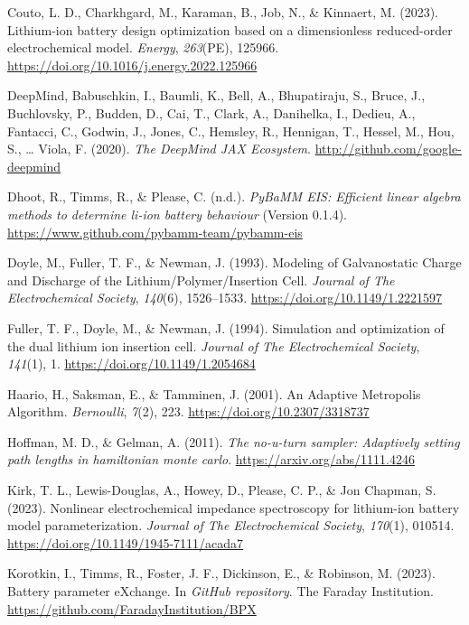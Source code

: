\documentclass[
]{article}
\newlength{\cslhangindent}
\newenvironment{CSLReferences}[2] %
 {\begin{list}{}{%
  \setlength{\itemindent}{0pt}
  \setlength{\leftmargin}{0pt}
  \setlength{\parsep}{0pt}
  \ifodd #1
   \setlength{\leftmargin}{\cslhangindent}
   \setlength{\itemindent}{-1\cslhangindent}
  \fi
  \setlength{\itemsep}{#2\baselineskip}}}
 {\end{list}}
\begin{document}
\begin{CSLReferences}{1}{0}
Couto, L. D., Charkhgard, M., Karaman, B., Job, N., \& Kinnaert, M.
(2023). Lithium-ion battery design optimization based on a dimensionless
reduced-order electrochemical model. \emph{Energy}, \emph{263}(PE),
125966. \url{https://doi.org/10.1016/j.energy.2022.125966}

DeepMind, Babuschkin, I., Baumli, K., Bell, A., Bhupatiraju, S., Bruce,
J., Buchlovsky, P., Budden, D., Cai, T., Clark, A., Danihelka, I.,
Dedieu, A., Fantacci, C., Godwin, J., Jones, C., Hemsley, R., Hennigan,
T., Hessel, M., Hou, S., \ldots{} Viola, F. (2020). \emph{The
{D}eep{M}ind {JAX} {E}cosystem}. \url{http://github.com/google-deepmind}

Dhoot, R., Timms, R., \& Please, C. (n.d.). \emph{PyBaMM EIS: Efficient
linear algebra methods to determine li-ion battery behaviour} (Version
0.1.4). \url{https://www.github.com/pybamm-team/pybamm-eis}

Doyle, M., Fuller, T. F., \& Newman, J. (1993). {Modeling of
Galvanostatic Charge and Discharge of the Lithium/Polymer/Insertion
Cell}. \emph{Journal of The Electrochemical Society}, \emph{140}(6),
1526--1533. \url{https://doi.org/10.1149/1.2221597}

Fuller, T. F., Doyle, M., \& Newman, J. (1994). Simulation and
optimization of the dual lithium ion insertion cell. \emph{Journal of
The Electrochemical Society}, \emph{141}(1), 1.
\url{https://doi.org/10.1149/1.2054684}

Haario, H., Saksman, E., \& Tamminen, J. (2001). An {Adaptive}
{Metropolis} {Algorithm}. \emph{Bernoulli}, \emph{7}(2), 223.
\url{https://doi.org/10.2307/3318737}

Hoffman, M. D., \& Gelman, A. (2011). \emph{The no-u-turn sampler:
Adaptively setting path lengths in hamiltonian monte carlo}.
\url{https://arxiv.org/abs/1111.4246}

Kirk, T. L., Lewis-Douglas, A., Howey, D., Please, C. P., \& Jon
Chapman, S. (2023). Nonlinear electrochemical impedance spectroscopy for
lithium-ion battery model parameterization. \emph{Journal of The
Electrochemical Society}, \emph{170}(1), 010514.
\url{https://doi.org/10.1149/1945-7111/acada7}

Korotkin, I., Timms, R., Foster, J. F., Dickinson, E., \& Robinson, M.
(2023). Battery parameter eXchange. In \emph{GitHub repository}. The
Faraday Institution. \url{https://github.com/FaradayInstitution/BPX}


\end{CSLReferences}
\end{document}
